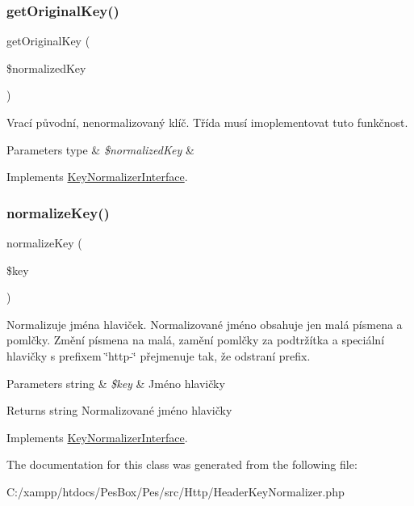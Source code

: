 \subsubsection{\texorpdfstring{get\+Original\+Key()}{getOriginalKey()}}
{\footnotesize\ttfamily get\+Original\+Key (\begin{DoxyParamCaption}\item[{}]{\$normalized\+Key }\end{DoxyParamCaption})}

Vrací původní, nenormalizovaný klíč. Třída musí imoplementovat tuto funkčnost. 
\begin{DoxyParams}[1]{Parameters}
type & {\em \$normalized\+Key} & \\
\hline
\end{DoxyParams}


Implements \mbox{\hyperlink{interface_pes_1_1_collection_1_1_normalizer_1_1_key_normalizer_interface_ad96b455525cff93be0dc81b5f6a4f8b9}{Key\+Normalizer\+Interface}}.

\mbox{\label{class_pes_1_1_http_1_1_header_key_normalizer_af39c624090b7badef56311d62a041c50}} 
\subsubsection{\texorpdfstring{normalize\+Key()}{normalizeKey()}}
{\footnotesize\ttfamily normalize\+Key (\begin{DoxyParamCaption}\item[{}]{\$key }\end{DoxyParamCaption})}

Normalizuje jména hlaviček. Normalizované jméno obsahuje jen malá písmena a pomlčky. Změní písmena na malá, zamění pomlčky za podtržítka a speciální hlavičky s prefixem \char`\"{}http-\/\char`\"{} přejmenuje tak, že odstraní prefix.


\begin{DoxyParams}[1]{Parameters}
string & {\em \$key} & Jméno hlavičky\\
\hline
\end{DoxyParams}
\begin{DoxyReturn}{Returns}
string Normalizované jméno hlavičky 
\end{DoxyReturn}


Implements \mbox{\hyperlink{interface_pes_1_1_collection_1_1_normalizer_1_1_key_normalizer_interface}{Key\+Normalizer\+Interface}}.



The documentation for this class was generated from the following file\+:\begin{DoxyCompactItemize}
\item 
C\+:/xampp/htdocs/\+Pes\+Box/\+Pes/src/\+Http/Header\+Key\+Normalizer.\+php\end{DoxyCompactItemize}
